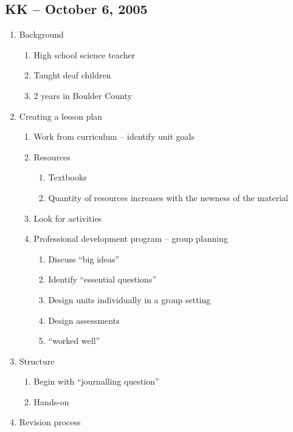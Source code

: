 \begingroup
\renewcommand{\labelenumi}{\Roman{enumi}.}
\renewcommand{\labelenumii}{\Alph{enumii}.}
\renewcommand{\labelenumiii}{\arabic{enumiii}.}
\renewcommand{\labelenumiv}{(\alpha{enumiv})}

\subsection{KK -- October 6, 2005}
\begin{enumerate}
	\item Background
		\begin{enumerate}
			\item High school science teacher
			\item Taught deaf children
			\item 2 years in Boulder County
		\end{enumerate}
	\item Creating a lesson plan
		\begin{enumerate}
			\item Work from curriculum -- identify unit goals
			\item Resources
				\begin{enumerate}
					\item Textbooks
					\item Quantity of resources increases with the newness of
						the material
				\end{enumerate}
			\item Look for activities
			\item Professional development program -- group planning
				\begin{enumerate}
					\item Discuss ``big ideas''
					\item Identify ``essential questions''
					\item Design units individually in a group setting
					\item Design assessments
					\item ``worked well''
				\end{enumerate}
		\end{enumerate}
	\item Structure
		\begin{enumerate}
			\item Begin with ``journalling question''
			\item Hands-on
		\end{enumerate}
	\item Revision process
		\begin{enumerate}

\end{enumerate}
\end{enumerate}

